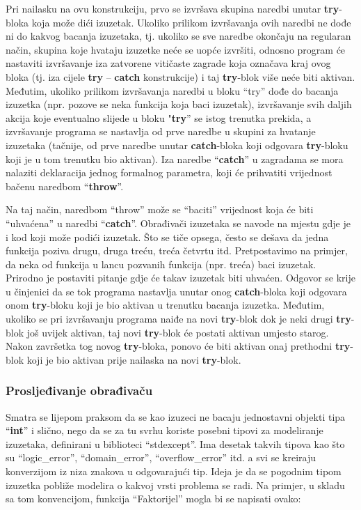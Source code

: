 \documentclass[11pt]{book}
\begin{document}
Pri nailasku na ovu konstrukciju, prvo se izvršava skupina naredbi unutar \textbf{try}-bloka koja može dići izuzetak. Ukoliko prilikom izvršavanja ovih naredbi ne dođe ni do kakvog bacanja izuzetaka, tj. ukoliko se sve naredbe okončaju na regularan način, skupina koje hvataju izuzetke neće se uopće izvršiti, odnosno program će nastaviti izvršavanje iza zatvorene vitičaste zagrade koja označava kraj ovog bloka  (tj. iza cijele \textbf{try} – \textbf{catch} konstrukcije) i taj \textbf{try}-blok više neće biti aktivan. Međutim, ukoliko prilikom izvršavanja naredbi u bloku “try” dođe do bacanja izuzetka (npr. pozove se neka funkcija koja baci izuzetak), izvršavanje svih daljih akcija koje eventualno slijede u bloku "\textbf{try}” se istog trenutka prekida, a  izvršavanje programa se nastavlja od prve naredbe u skupini za hvatanje izuzetaka (tačnije, od prve naredbe unutar \textbf{catch}-bloka koji odgovara \textbf{try}-bloku koji je u tom trenutku bio aktivan). Iza naredbe “\textbf{catch}” u zagradama se mora nalaziti deklaracija jednog formalnog parametra, koji će prihvatiti vrijednost bačenu naredbom “\textbf{throw}”.

Na taj način, naredbom “throw\textbf{}” može se “baciti” vrijednost koja će biti “uhvaćena” u naredbi “\textbf{catch}”.  Obrađivači izuzetaka se navode na mjestu gdje je i kod koji može podići izuzetak.  Što se tiče opsega, često se dešava da jedna funkcija poziva drugu, druga treću, treća četvrtu itd. Pretpostavimo na primjer, da neka od funkcija u lancu pozvanih funkcija (npr. treća) baci izuzetak. Prirodno je postaviti pitanje gdje će takav izuzetak biti uhvaćen. Odgovor se krije u činjenici da se tok programa nastavlja unutar onog \textbf{catch}-bloka koji odgovara onom \textbf{try}-bloku koji je bio aktivan u trenutku bacanja izuzetka. Međutim, ukoliko se pri izvršavanju programa naiđe na novi \textbf{try}-blok dok je neki drugi \textbf{try}-blok još uvijek aktivan, taj novi \textbf{try}-blok će postati aktivan  umjesto  starog.  Nakon  završetka  tog  novog  \textbf{try}-bloka,  ponovo  će  biti  aktivan  onaj prethodni \textbf{try}-blok koji je bio aktivan prije nailaska na novi \textbf{try}-blok.

\subsubsection{Prosljeđivanje obrađivaču}
Smatra se lijepom praksom da se kao izuzeci ne bacaju jednostavni objekti  tipa  “\textbf{int}”  i  slično,  nego  da  se  za  tu  svrhu  koriste  posebni  tipovi  za  modeliranje izuzetaka, definirani u biblioteci “stdexcept”. Ima desetak takvih tipova kao što su “logic\_error”, “domain\_error”,  “overflow\_error”  itd.  a  svi  se  kreiraju  konverzijom  iz  niza  znakova  u odgovarajući tip. Ideja je da se pogodnim tipom izuzetka pobliže modelira o kakvoj vrsti problema se radi. Na primjer, u skladu sa tom konvencijom, funkcija “Faktorijel” mogla bi se napisati ovako:
\end{document}
